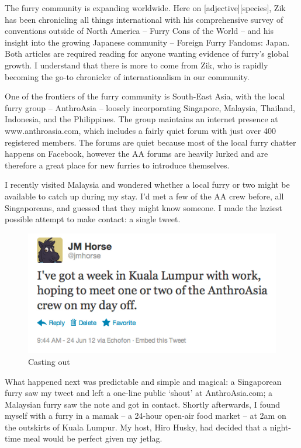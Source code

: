 
The furry community is expanding worldwide. Here on [adjective][species], Zik has been chronicling all things international with his comprehensive survey of conventions outside of North America -- Furry Cons of the World -- and his insight into the growing Japanese community -- Foreign Furry Fandoms: Japan. Both articles are required reading for anyone wanting evidence of furry's global growth. I understand that there is more to come from Zik, who is rapidly becoming the go-to chronicler of internationalism in our community.

One of the frontiers of the furry community is South-East Asia, with the local furry group -- AnthroAsia -- loosely incorporating Singapore, Malaysia, Thailand, Indonesia, and the Philippines. The group maintains an internet presence at www.anthroasia.com, which includes a fairly quiet forum with just over 400 registered members. The forums are quiet because most of the local furry chatter happens on Facebook, however the AA forums are heavily lurked and are therefore a great place for new furries to introduce themselves.

I recently visited Malaysia and wondered whether a local furry or two might be available to catch up during my stay. I'd met a few of the AA crew before, all Singaporeans, and guessed that they might know someone. I made the laziest possible attempt to make contact: a single tweet.

\begin{figure}
  \begin{center}
    \includegraphics{content/assets/furry-accommodation--jmtweet}
  \end{center}
  \caption{Casting out}
\end{figure}

What happened next was predictable and simple and magical: a Singaporean furry saw my tweet and left a one-line public `shout' at AnthroAsia.com; a Malaysian furry saw the note and got in contact. Shortly afterwards, I found myself with a furry in a mamak -- a 24-hour open-air food market -- at 2am on the outskirts of Kuala Lumpur. My host, Hiro Husky, had decided that a night-time meal would be perfect given my jetlag.

